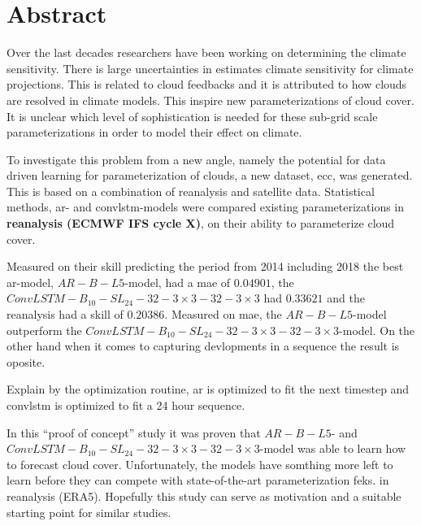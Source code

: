 \chapter*{Abstract}

Over the last decades researchers have been working on determining the climate sensitivity. 
There is large uncertainties in estimates climate sensitivity for climate projections. This is related to cloud feedbacks and it is attributed to how clouds are resolved in climate models. 
This inspire new parameterizations of cloud cover. It is unclear which level of sophistication is needed for these sub-grid scale parameterizations in order to model their effect on climate.

To investigate this problem from a new angle, namely the potential for data driven learning for parameterization of clouds, a new dataset, \acrfull{ecc}, was generated. This is based on a combination of reanalysis and satellite data. %
Statistical methods, \acrfull{ar}- and \acrfull{convlstm}-models were compared existing parameterizations in \textbf{reanalysis (ECMWF IFS cycle X)}, on their ability to parameterize cloud cover. 

Measured on their skill predicting the period
from 2014 including 2018 the best \acrshort{ar}-model, $AR-B-L5$-model, had a \acrshort{mae} of $0.04901$,  the $ConvLSTM-B_{10}-SL_{24}-32-3\times3-32-3 \times3$ had $0.33621$ and the reanalysis had a skill of $0.20386$. Measured on \acrshort{mae}, the $AR-B-L5$-model outperform the $ConvLSTM-B_{10}-SL_{24}-32-3\times3-32-3 \times3$-model. On the other hand when it comes to capturing devlopments in a sequence the result is oposite. 

Explain by the optimization routine, \acrshort{ar} is optimized to fit the next timestep and \acrshort{convlstm} is optimized to fit a 24 hour sequence.

In this ``proof of concept'' study it was proven that $AR-B-L5$- and $ConvLSTM-B_{10}-SL_{24}-32-3\times3-32-3 \times3$-model was able to learn how to forecast cloud cover. Unfortunately, the models have somthing more left to learn before they can compete with state-of-the-art parameterization feks. in reanalysis (ERA5). Hopefully this study can serve as motivation and a suitable starting point for similar studies.  
\cleardoublepage